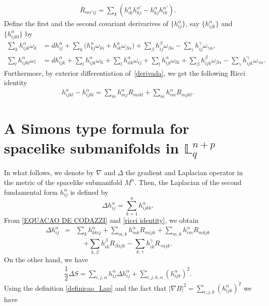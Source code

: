 \documentclass[leqno,11pt]{amsart}
\theoremstyle{plain}
\theoremstyle{definition}
\numberwithin{equation}{section}
\begin{document}
\begin{eqnarray}\label{EQUACAO DE RICCI}
\overline{R}_{\alpha \alpha' ij}=\sum_{k}(h_{ik}^{\alpha}h_{kj}^{\alpha'}-h_{kj}^{\alpha}h_{ik}^{\alpha'}).
\end{eqnarray}
Define the first and the second covariant derivarives of $\{h_{ij}^{\alpha}\}$, say $\{h_{ijk}^{\alpha}\}$ and $\{h_{ijkl}^{\alpha}\}$ by
$$
\begin{aligned}
\sum_{k} h_{ijk}^{\alpha}\omega_k 
  &= dh_{ij}^{\alpha} 
   + \sum_{k} \big(h_{kj}^{\alpha}\omega_{ki} + h_{ik}^{\alpha}\omega_{\beta \alpha}\big) 
   + \sum_{\beta} h_{ij}^{\beta}\omega_{\beta \alpha} 
   - \sum_{\gamma} h_{ij}^{\gamma}\omega_{\gamma \alpha}, \\[6pt]
\sum_{l} h_{ijkl}^{\alpha}\omega_l 
  &= dh_{ijk}^{\alpha} 
   + \sum_{l} h_{ijk}^{\alpha}\omega_{li} 
   + \sum_{l} h_{ilk}^{\alpha}\omega_{ij} 
   + \sum_{l} h_{ijl}^{\alpha}\omega_{lk} 
   + \sum_{\beta} h_{ijk}^{\beta}\omega_{\beta \alpha} 
   - \sum_{\gamma} h_{ijk}^{\gamma}\omega_{\gamma \alpha}.
\end{aligned}
$$
Furthermore, by exterior differentiation of~\eqref{derivada}, we get the following Ricci identity
\begin{eqnarray}\label{ricci identity}
h_{ijkl}^{\alpha}-h_{ijlk}^{\alpha}=\sum_{m}h_{mj}^{\alpha}R_{mikl}+\sum_{m}h_{mi}^{\alpha}R_{mjkl}.
\end{eqnarray}

\section{A Simons type formula for spacelike submanifolds in $\mathbb{L}^{n+p}_ q$}\label{sec:simons}

In what follows, we denote by $\nabla$ and $\Delta$ the gradient and Laplacian operator in the metric of the spacelike submanifold $M^n$. Then, the Laplacian of the second fundamental form $h^{\alpha}_{ij}$ is defined by 
\begin{equation}\label{definicao_Lap}
\Delta h^{\alpha}_{ij} = \sum_{k=1}^n h^{\alpha}_{ijkk}.
\end{equation}
From \eqref{EQUACAO DE CODAZZI} and \eqref{ricci identity}, we obtain
\begin{eqnarray}\label{laplac}
\Delta h_{ij}^{\alpha} &=& \sum_k h_{kkij}^{\alpha}+ \sum_{m,k}h_{mk}^{\alpha}R_{mijk}+\sum_{m,k}h_{im}^{\alpha}R_{mkjk}
\end{eqnarray}
$$
+\sum_{k,\beta}h_{ik}^{\beta}R_{\beta\alpha jk} -\sum_{k,\gamma}h_{ik}^{\gamma}R_{\gamma\alpha jk}.
$$
On the other hand, we have
\begin{eqnarray*}
\dfrac{1}{2}\Delta S=\sum_{i,j,\alpha}h_{ij}^{\alpha}\Delta h_{ij}^{\alpha}+\sum_{i,j,k,\alpha}(h_{ijk}^{\alpha})^2.
\end{eqnarray*}
Using the definition \eqref{definicao_Lap} and the fact that $|\nabla B|^2=\displaystyle\sum_{i,j,k}(h_{ijk}^{\alpha})^2$ we have
\end{document}
